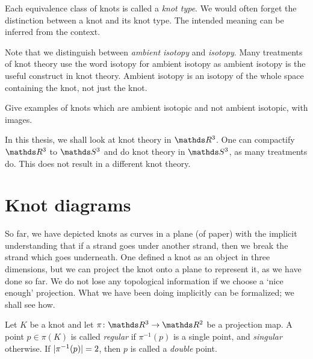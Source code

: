 \begin{remark}
    Each equivalence class of knots is called a \textit{knot type}. We would often forget the distinction between a knot and its knot type. The intended meaning can be inferred from the context.
\end{remark}

\begin{remark}
    Note that we distinguish between \textit{ambient isotopy} and \textit{isotopy}. Many treatments of knot theory use the word isotopy for ambient isotopy as ambient isotopy is the useful construct in knot theory. Ambient isotopy is an isotopy of the whole space containing the knot, not just the knot.
\end{remark}


Give examples of knots which are ambient isotopic and not ambient isotopic, with images.

\begin{remark}
    In this thesis, we shall look at knot theory in \(\rthree\). One can compactify \(\rthree\) to \(\sthree\) and do knot theory in \(\sthree\), as many treatments do. This does not result in a different knot theory.
\end{remark}

\section{Knot diagrams}

So far, we have depicted knots as curves in a plane (of paper) with the implicit understanding that if a strand goes under another strand, then we break the strand which goes underneath. One defined a knot as an object in three dimensions, but we can project the knot onto a plane to represent it, as we have done so far. We do not lose any topological information if we choose a `nice enough' projection. What we have been doing implicitly can be formalized; we shall see how.

Let \(K\) be a knot and let \(\pi \colon \rthree \rightarrow \rtwo\) be a projection map. A point \(p \in \pi(K)\) is called \textit{regular} if \(\pi^{-1}(p)\) is a single point, and \textit{singular} otherwise. If \(\lvert\pi^{-1}(p)\rvert = 2\), then \(p\) is called a \textit{double} point.


%
%
%

